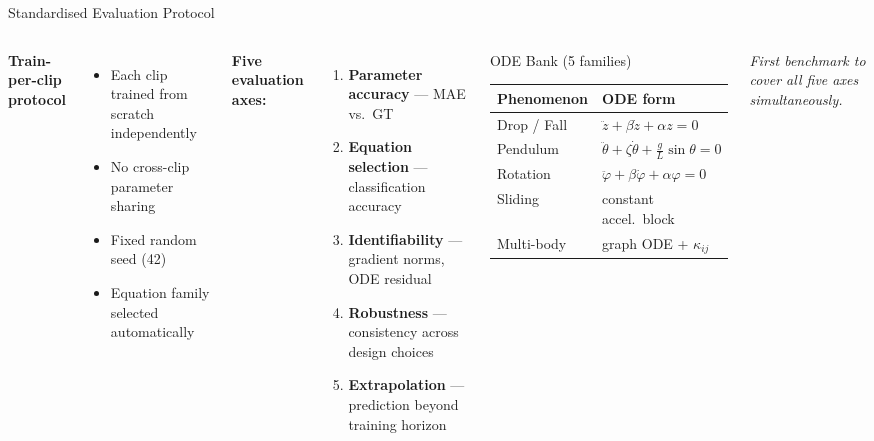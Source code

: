 \documentclass[aspectratio=169,12pt]{beamer}
\newcommand{\highlight}[1]{\textcolor{irisblue}{\textbf{#1}}}
\begin{document}
\begin{frame}{Standardised Evaluation Protocol}
  \begin{columns}[T]
      \textbf{Train-per-clip protocol}
      \begin{itemize}\setlength\itemsep{0.3em}
        \item Each clip trained from scratch independently
        \item No cross-clip parameter sharing
        \item Fixed random seed (42)
        \item Equation family selected automatically
      \end{itemize}
      \vspace{0.6em}
      \textbf{Five evaluation axes:}
      \begin{enumerate}\setlength\itemsep{0.3em}
        \item \highlight{Parameter accuracy} — MAE vs.\ GT
        \item \highlight{Equation selection} — classification accuracy
        \item \highlight{Identifiability} — gradient norms, ODE residual
        \item \highlight{Robustness} — consistency across design choices
        \item \highlight{Extrapolation} — prediction beyond training horizon
      \end{enumerate}

      \begin{block}{ODE Bank (5 families)}
        \begin{tabular}{ll}
          \toprule
          \textbf{Phenomenon} & \textbf{ODE form} \\
          \midrule
          Drop / Fall & $\ddot{z}+\beta\dot{z}+\alpha z=0$ \\
          Pendulum & $\ddot{\theta}+\zeta\dot{\theta}+\frac{g}{L}\sin\theta=0$ \\
          Rotation & $\ddot{\varphi}+\beta\dot{\varphi}+\alpha\varphi=0$ \\
          Sliding & constant accel.\ block \\
          Multi-body & graph ODE + $\kappa_{ij}$ \\
          \bottomrule
        \end{tabular}
      \end{block}
      \vspace{0.4em}
      \textit{First benchmark to cover all five axes simultaneously.}
  \end{columns}
\end{frame}
\end{document}
